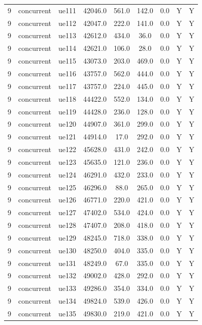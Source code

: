 \begin{table}[ht]
\begin{tabular}{|c|c|c|c|c|c|c|c|c|}
9 & concurrent & ue111 & 42046.0 & 561.0 & 142.0 & 0.0 & Y & Y \\
9 & concurrent & ue112 & 42047.0 & 222.0 & 141.0 & 0.0 & Y & Y \\
9 & concurrent & ue113 & 42612.0 & 434.0 & 36.0 & 0.0 & Y & Y \\
9 & concurrent & ue114 & 42621.0 & 106.0 & 28.0 & 0.0 & Y & Y \\
9 & concurrent & ue115 & 43073.0 & 203.0 & 469.0 & 0.0 & Y & Y \\
9 & concurrent & ue116 & 43757.0 & 562.0 & 444.0 & 0.0 & Y & Y \\
9 & concurrent & ue117 & 43757.0 & 224.0 & 445.0 & 0.0 & Y & Y \\
9 & concurrent & ue118 & 44422.0 & 552.0 & 134.0 & 0.0 & Y & Y \\
9 & concurrent & ue119 & 44428.0 & 236.0 & 128.0 & 0.0 & Y & Y \\
9 & concurrent & ue120 & 44907.0 & 361.0 & 299.0 & 0.0 & Y & Y \\
9 & concurrent & ue121 & 44914.0 & 17.0 & 292.0 & 0.0 & Y & Y \\
9 & concurrent & ue122 & 45628.0 & 431.0 & 242.0 & 0.0 & Y & Y \\
9 & concurrent & ue123 & 45635.0 & 121.0 & 236.0 & 0.0 & Y & Y \\
9 & concurrent & ue124 & 46291.0 & 432.0 & 233.0 & 0.0 & Y & Y \\
9 & concurrent & ue125 & 46296.0 & 88.0 & 265.0 & 0.0 & Y & Y \\
9 & concurrent & ue126 & 46771.0 & 220.0 & 421.0 & 0.0 & Y & Y \\
9 & concurrent & ue127 & 47402.0 & 534.0 & 424.0 & 0.0 & Y & Y \\
9 & concurrent & ue128 & 47407.0 & 208.0 & 418.0 & 0.0 & Y & Y \\
9 & concurrent & ue129 & 48245.0 & 718.0 & 338.0 & 0.0 & Y & Y \\
9 & concurrent & ue130 & 48250.0 & 404.0 & 335.0 & 0.0 & Y & Y \\
9 & concurrent & ue131 & 48249.0 & 67.0 & 335.0 & 0.0 & Y & Y \\
9 & concurrent & ue132 & 49002.0 & 428.0 & 292.0 & 0.0 & Y & Y \\
9 & concurrent & ue133 & 49286.0 & 354.0 & 334.0 & 0.0 & Y & Y \\
9 & concurrent & ue134 & 49824.0 & 539.0 & 426.0 & 0.0 & Y & Y \\
9 & concurrent & ue135 & 49830.0 & 219.0 & 421.0 & 0.0 & Y & Y \\

\end{tabular}
\end{table}
